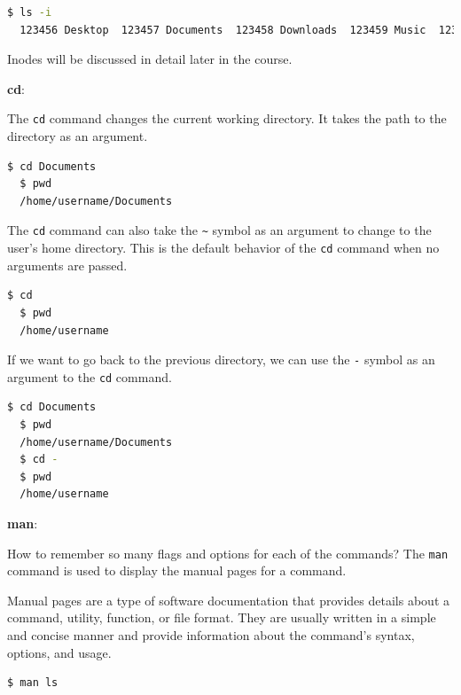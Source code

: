 \begin{lstlisting}[language=bash]
  $ ls -i
  123456 Desktop  123457 Documents  123458 Downloads  123459 Music  123460 Pictures  123461 Videos
\end{lstlisting}

Inodes will be discussed in detail later in the course.

\textbf{cd}:

The \texttt{cd} command changes the current working directory. It takes the path to the directory as an argument.

\begin{lstlisting}[language=bash]
  $ cd Documents
  $ pwd
  /home/username/Documents
\end{lstlisting}

The \texttt{cd} command can also take the \texttt{\textasciitilde} symbol as an argument to change to the user's home directory.
This is the default behavior of the \texttt{cd} command when no arguments are passed.

\begin{lstlisting}[language=bash]
  $ cd
  $ pwd
  /home/username
\end{lstlisting}

If we want to go back to the previous directory, we can use the \texttt{-} symbol as an argument to the \texttt{cd} command.

\begin{lstlisting}[language=bash]
  $ cd Documents
  $ pwd
  /home/username/Documents
  $ cd -
  $ pwd
  /home/username
\end{lstlisting}

\textbf{man}:

How to remember so many flags and options for each of the commands?
The \texttt{man} command is used to display the manual pages for a command.

\begin{definition}
  Manual pages are a type of software documentation that provides details about a command, utility, function, or file format. They are usually written in a simple and concise manner and provide information about the command's syntax, options, and usage.
\end{definition}

\begin{lstlisting}[language=bash]
  $ man ls
\end{lstlisting}

